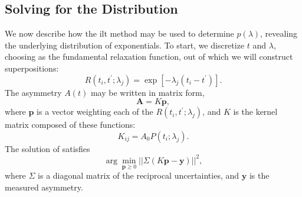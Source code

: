 \subsection{Solving for the Distribution}

We now describe how the \gls{ilt} method may be used to determine $p ( \lambda )$, revealing the underlying distribution of exponentials.
To start, we discretize $t$ and $\lambda$, choosing  as the fundamental relaxation function, out of which we will construct superpositions:
%
\begin{equation} \label{eq:slr-discrete}
   R \left (t_{i}, t^{\prime};\lambda_j \right ) = \exp \left [- \lambda_{j} \left ( t_{i} - t^{\prime} \right ) \right ] .
\end{equation}
%
The asymmetry $A(t)$ may be written in matrix form,
%
\begin{equation} \label{eq:signal-matrix}
   \mathbf{A} = K \mathbf{p},
\end{equation}
%
where $\mathbf{p}$ is a vector weighting each of the $R \left (t_{i}, t^{\prime};\lambda_j \right )$, and $K$ is the kernel matrix composed of these functions:
%
\begin{equation}
   \label{eq:kernel}
   K_{ij} = A_{0} P(t_i;\lambda_j).
\end{equation}
%
The solution of  satisfies
%
\begin{equation}
   \label{eq:onnls}
   \arg \min_{\mathbf{p} \geq 0} || \Sigma \left ( K \mathbf{p} - \mathbf{y} \right ) ||^{2} ,
\end{equation}
%
where $\Sigma$ is a diagonal matrix of the reciprocal uncertainties, and $\mathbf{y}$ is the measured asymmetry. 

